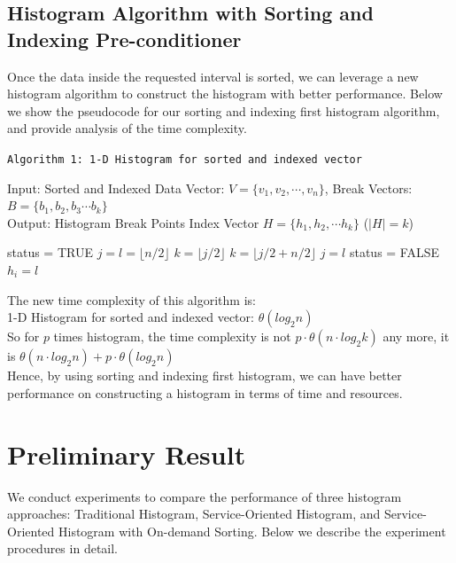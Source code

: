 \documentclass[times, 10pt,onecolumn]{article} %
\begin{document}
\subsection{Histogram Algorithm with Sorting and Indexing Pre-conditioner}
Once the data inside the requested interval is sorted, we can leverage a new histogram algorithm to construct the histogram with better performance. Below we show the pseudocode for our sorting and indexing first histogram algorithm, and provide analysis of the time complexity.

\texttt{Algorithm 1: 1-D Histogram for sorted and indexed vector}

Input: Sorted and Indexed Data Vector: $V=\{v_1, v_2, \cdots, v_n\}$, Break Vectors: $B =\{b_1, b_2, b_3 \cdots b_k\}$\\
Output: Histogram Break Points  Index Vector $H=\{h_1, h_2, \cdots h_k\}$  ($|H| = k$)
\begin{center}
\begin{algorithmic}
	\STATE status = TRUE
	\STATE $j = l = \lfloor n/2 \rfloor$
			\STATE $k = \lfloor j/2 \rfloor$
		\ENDIF
			\STATE $k = \lfloor j/2+n/2 \rfloor$
		\ENDIF
			\STATE $j = l$
		\ENDIF
			\STATE status = FALSE
			\STATE $h_i = l$
		\ENDIF
	\ENDWHILE
\ENDFOR
\end{algorithmic}
\end{center}

The new time complexity of this algorithm is:\\
1-D Histogram for sorted and indexed vector: $\theta(log_2n)$\\
So for $p$ times histogram, the time complexity is not $p \cdot \theta( n \cdot log_2k)$ any more, it is $\theta(n \cdot log_2n) + p \cdot \theta(log_2n)$\\
Hence, by using sorting and indexing first histogram, we can have better performance on constructing a histogram in terms of time and resources.


\section{Preliminary Result}

We conduct experiments to compare the performance of three histogram approaches: Traditional Histogram, Service-Oriented Histogram, and Service-Oriented Histogram with On-demand Sorting. Below we describe the experiment procedures in detail.
\end{document}
